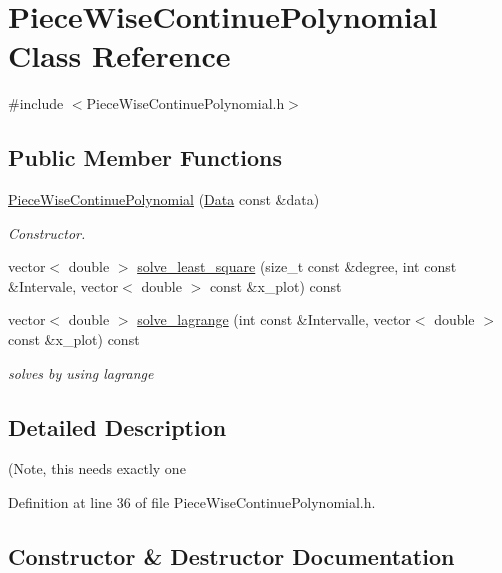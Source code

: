 \hypertarget{class_piece_wise_continue_polynomial}{}\section{Piece\+Wise\+Continue\+Polynomial Class Reference}
\label{class_piece_wise_continue_polynomial}


{\ttfamily \#include $<$Piece\+Wise\+Continue\+Polynomial.\+h$>$}

\subsection*{Public Member Functions}
\begin{DoxyCompactItemize}
\item 
\mbox{\hyperlink{class_piece_wise_continue_polynomial_a1f3e40054d55cacc9079084683e259e7}{Piece\+Wise\+Continue\+Polynomial}} (\mbox{\hyperlink{struct_data}{Data}} const \&data)
\begin{DoxyCompactList}\small\item\em Constructor. \end{DoxyCompactList}\item 
vector$<$ double $>$ \mbox{\hyperlink{class_piece_wise_continue_polynomial_a39966b5bfa4d0ca686eb4fa191dbfa7c}{solve\+\_\+least\+\_\+square}} (size\+\_\+t const \&degree, int const \&Intervale, vector$<$ double $>$ const \&x\+\_\+plot) const
\item 
vector$<$ double $>$ \mbox{\hyperlink{class_piece_wise_continue_polynomial_a19731122369c27f68802687e7d64aaf5}{solve\+\_\+lagrange}} (int const \&Intervalle, vector$<$ double $>$ const \&x\+\_\+plot) const
\begin{DoxyCompactList}\small\item\em solves by using lagrange \end{DoxyCompactList}\end{DoxyCompactItemize}


\subsection{Detailed Description}
(Note, this needs exactly one 

Definition at line 36 of file Piece\+Wise\+Continue\+Polynomial.\+h.



\subsection{Constructor \& Destructor Documentation}
\mbox{\label{class_piece_wise_continue_polynomial_a1f3e40054d55cacc9079084683e259e7}} 
